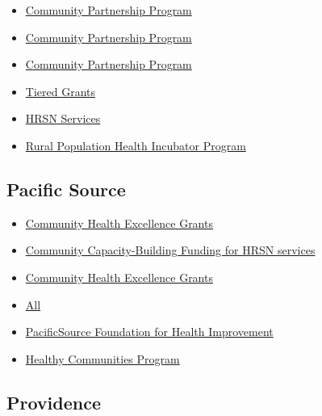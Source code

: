 \documentclass[
  letterpaper,
  DIV=11,
  numbers=noendperiod]{scrreprt}
\providecommand{\tightlist}{%
  \setlength{\itemsep}{0pt}\setlength{\parskip}{0pt}}\usepackage{longtable,booktabs,array}
\begin{document}
\begin{itemize}
\tightlist
\item
  \href{https://www.ohsu.edu/knight-cancer-institute/community-partnership-program-grants}{Community
  Partnership Program}
\item
  \href{https://www.ohsu.edu/knight-cancer-institute/how-apply-community-grant}{Community
  Partnership Program}
\item
  \href{https://www.ohsu.edu/sites/default/files/2024-01/CPP_RFP_2024.1_FINAL_lowres_0.pdf}{Community
  Partnership Program}
\item
  \href{https://www.ohsu.edu/knight-cancer-institute/tiered-grants}{Tiered
  Grants}
\item
  \href{https://www.ohsu.edu/health-services}{HRSN Services}
\item
  \href{https://www.ohsu.edu/oregon-office-of-rural-health/rural-population-health-incubator-program}{Rural
  Population Health Incubator Program}
\end{itemize}

\subsection{Pacific Source}\label{pacific-source}

\begin{itemize}
\tightlist
\item
  \href{https://pacificsource.com/sites/default/files/2023-02/PRV510_0123_CHE\%20Flier.pdf}{Community
  Health Excellence Grants}
\item
  \href{https://pacificsource.com/article/community-capacity-building-funding-hrsn-services}{Community
  Capacity-Building Funding for HRSN services}
\item
  \href{https://www.ruralhealthinfo.org/funding/5469}{Community Health
  Excellence Grants}
\item
  \href{https://pacificsource.com/sites/default/files/2023-08/CLB1330_0823_PacificSource\%20Funding\%20Navigation\%20Guide.pdf}{All}
\item
  \href{https://pacificsource.com/community/foundation?utm_source=pdf&utm_medium=flier&utm_campaign=FundingGuide&utm_id=CLB1330}{PacificSource
  Foundation for Health Improvement}
\item
  \href{http://www.grantinterface.com/Home/Logon}{Healthy Communities
  Program}
\end{itemize}

\subsection{Providence}\label{providence}
\end{document}
